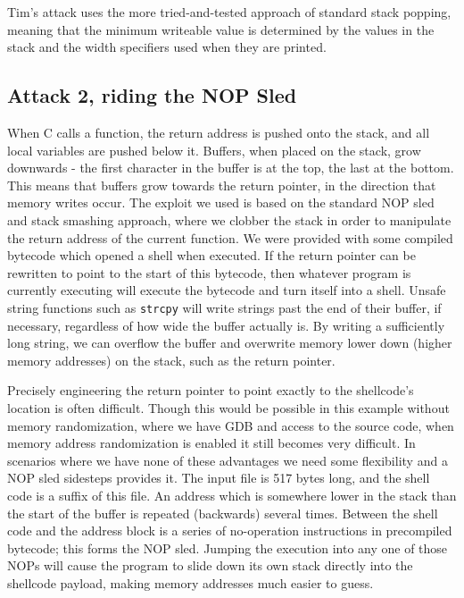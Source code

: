Tim's attack uses the more tried-and-tested approach of standard stack popping, meaning that the minimum writeable value
is determined by the values in the stack and the width specifiers used when they are printed.

\subsection{Attack 2, riding the NOP Sled}

When C calls a function, the return address is pushed onto the stack, and all local variables are pushed below it.
Buffers, when placed on the stack, grow downwards - the first character in the buffer is at the top, the last at the
bottom. This means that buffers grow towards the return pointer, in the direction that memory writes occur. The exploit
we used is based on the standard NOP sled and stack smashing approach, where we clobber the stack in order to manipulate
the return address of the current function. We were provided with some compiled bytecode which opened a shell when
executed. If the return pointer can be rewritten to point to the start of this bytecode, then whatever program is
currently executing will execute the bytecode and turn itself into a shell. Unsafe string functions such as {\tt strcpy}
will write strings past the end of their buffer, if necessary, regardless of how wide the buffer actually is. By writing
a sufficiently long string, we can overflow the buffer and overwrite memory lower down (higher memory addresses) on the
stack, such as the return pointer.

Precisely engineering the return pointer to point exactly to the shellcode's location is often difficult. Though this
would be possible in this example without memory randomization, where we have GDB and access to the source code, when
memory address randomization is enabled it still becomes very difficult. In scenarios where we have none of these
advantages we need some flexibility and a NOP sled sidesteps provides it. The input file is 517 bytes long, and the
shell code is a suffix of this file. An address which is somewhere lower in the stack than the start of the buffer is
repeated (backwards) several times. Between the shell code and the address block is a series of no-operation
instructions in precompiled bytecode; this forms the NOP sled. Jumping the execution into any one of those NOPs will
cause the program to slide down its own stack directly into the shellcode payload, making memory addresses much easier
to guess.

